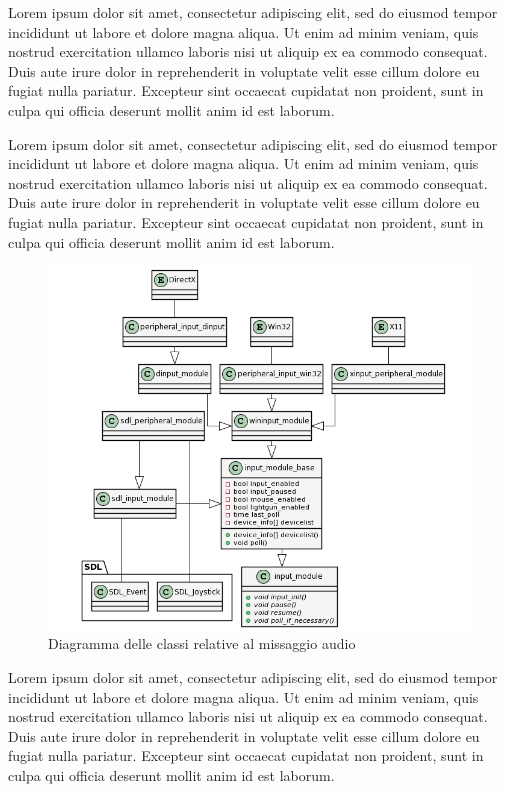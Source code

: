 Lorem ipsum dolor sit amet, consectetur adipiscing elit, sed do eiusmod tempor incididunt ut labore et dolore magna aliqua. Ut enim ad minim veniam, quis nostrud exercitation ullamco laboris nisi ut aliquip ex ea commodo consequat. Duis aute irure dolor in reprehenderit in voluptate velit esse cillum dolore eu fugiat nulla pariatur. Excepteur sint occaecat cupidatat non proident, sunt in culpa qui officia deserunt mollit anim id est laborum.

Lorem ipsum dolor sit amet, consectetur adipiscing elit, sed do eiusmod tempor incididunt ut labore et dolore magna aliqua. Ut enim ad minim veniam, quis nostrud exercitation ullamco laboris nisi ut aliquip ex ea commodo consequat. Duis aute irure dolor in reprehenderit in voluptate velit esse cillum dolore eu fugiat nulla pariatur. Excepteur sint occaecat cupidatat non proident, sunt in culpa qui officia deserunt mollit anim id est laborum.

\begin{figure}[H]
	\includegraphics[width=\linewidth]{immagini/class_input_module}
	\caption{Diagramma delle classi relative al missaggio audio}
	\label{fig:class_input_module}
\end{figure}

Lorem ipsum dolor sit amet, consectetur adipiscing elit, sed do eiusmod tempor incididunt ut labore et dolore magna aliqua. Ut enim ad minim veniam, quis nostrud exercitation ullamco laboris nisi ut aliquip ex ea commodo consequat. Duis aute irure dolor in reprehenderit in voluptate velit esse cillum dolore eu fugiat nulla pariatur. Excepteur sint occaecat cupidatat non proident, sunt in culpa qui officia deserunt mollit anim id est laborum.

